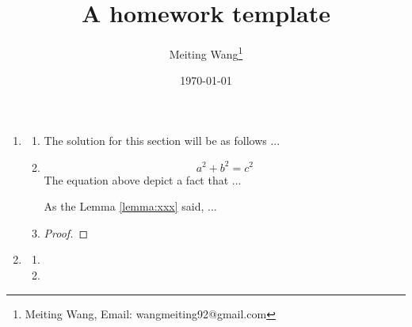 \documentclass[UTF8]{article} %
\title{
	A homework template
}
\author{Meiting Wang\thanks{Meiting Wang, Email: wangmeiting92@gmail.com}}
\date{\today}
\begin{document}
\maketitle

\begin{enumerate}
    \item \lipsum[1][1-3] %
    \begin{enumerate}
        \item \lipsum[2][2-3]
        
        The solution for this section will be as follows ...
        
        \item \lipsum[2][2-3]
        
        \begin{lemma}
            \lipsum[3][2-3]
            \[ a^2 + b^2 = c^2 \]
            The equation above depict a fact that ...
        \end{lemma}
        
        \begin{lemma}[xxx]\label{lemma:xxx}
            \lipsum[3][2-3]
        \end{lemma}
        
        As the Lemma \ref{lemma:xxx} said, ...
        
        \item \lipsum[2][2-3]
        
        \begin{theorem}
            \lipsum[1][1-4]
        \end{theorem}
        
        \begin{proof}
            \lipsum[3][1-3]
        \end{proof}
        
    \end{enumerate}
    \item \lipsum[1][1-3] %
    \begin{enumerate}
        \item \lipsum[2][2-3]
        
        \lipsum[1][1-8]
        
        \item \lipsum[2][2-3]
        

\end{enumerate}
\end{enumerate}
\end{document}
